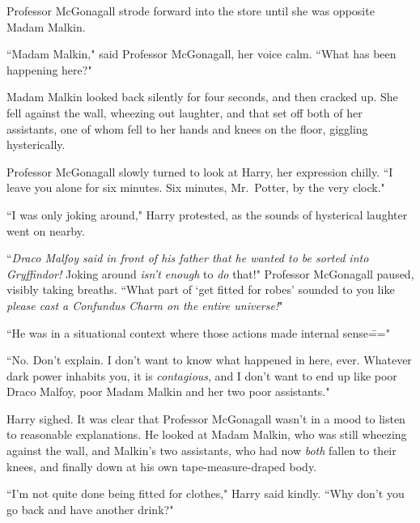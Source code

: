 Professor McGonagall strode forward into the store until she was opposite Madam Malkin.

``Madam Malkin," said Professor McGonagall, her voice calm. ``What has been happening here?"

Madam Malkin looked back silently for four seconds, and then cracked up. She fell against the wall, wheezing out laughter, and that set off both of her assistants, one of whom fell to her hands and knees on the floor, giggling hysterically.

Professor McGonagall slowly turned to look at Harry, her expression chilly. ``I leave you alone for six minutes. Six minutes, Mr.~Potter, by the very clock."

``I was only joking around," Harry protested, as the sounds of hysterical laughter went on nearby.

``\emph{Draco Malfoy said in front of his father that he wanted to be sorted into Gryffindor!} Joking around \emph{isn't enough} to \emph{do} that!" Professor McGonagall paused, visibly taking breaths. ``What part of `get fitted for robes' sounded to you like \emph{please cast a Confundus Charm on the entire universe!}"

``He was in a situational context where those actions made internal sense\==="

``No. Don't explain. I don't want to know what happened in here, ever. Whatever dark power inhabits you, it is \emph{contagious}, and I don't want to end up like poor Draco Malfoy, poor Madam Malkin and her two poor assistants."

Harry sighed. It was clear that Professor McGonagall wasn't in a mood to listen to reasonable explanations. He looked at Madam Malkin, who was still wheezing against the wall, and Malkin's two assistants, who had now \emph{both} fallen to their knees, and finally down at his own tape-measure-draped body.

``I'm not quite done being fitted for clothes," Harry said kindly. ``Why don't you go back and have another drink?"

